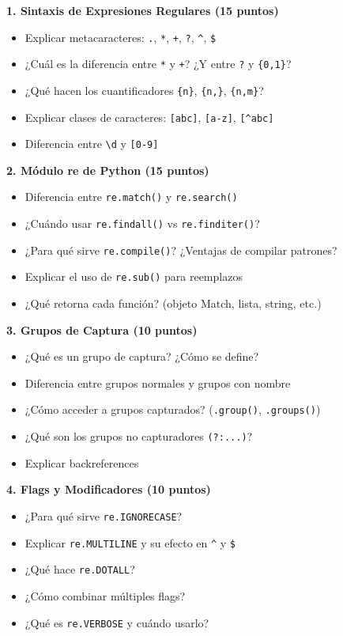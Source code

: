 \documentclass[11pt,letterpaper]{article}
\begin{document}
\textbf{1. Sintaxis de Expresiones Regulares (15 puntos)}
\begin{itemize}
    \item Explicar metacaracteres: \texttt{.}, \texttt{*}, \texttt{+}, \texttt{?}, \texttt{\^{}}, \texttt{\$}
    \item ¿Cuál es la diferencia entre \texttt{*} y \texttt{+}? ¿Y entre \texttt{?} y \texttt{\{0,1\}}?
    \item ¿Qué hacen los cuantificadores \texttt{\{n\}}, \texttt{\{n,\}}, \texttt{\{n,m\}}?
    \item Explicar clases de caracteres: \texttt{[abc]}, \texttt{[a-z]}, \texttt{[\^{}abc]}
    \item Diferencia entre \texttt{\textbackslash d} y \texttt{[0-9]}
\end{itemize}

\textbf{2. Módulo re de Python (15 puntos)}
\begin{itemize}
    \item Diferencia entre \texttt{re.match()} y \texttt{re.search()}
    \item ¿Cuándo usar \texttt{re.findall()} vs \texttt{re.finditer()}?
    \item ¿Para qué sirve \texttt{re.compile()}? ¿Ventajas de compilar patrones?
    \item Explicar el uso de \texttt{re.sub()} para reemplazos
    \item ¿Qué retorna cada función? (objeto Match, lista, string, etc.)
\end{itemize}

\textbf{3. Grupos de Captura (10 puntos)}
\begin{itemize}
    \item ¿Qué es un grupo de captura? ¿Cómo se define?
    \item Diferencia entre grupos normales y grupos con nombre
    \item ¿Cómo acceder a grupos capturados? (\texttt{.group()}, \texttt{.groups()})
    \item ¿Qué son los grupos no capturadores \texttt{(?:...)}?
    \item Explicar backreferences
\end{itemize}

\textbf{4. Flags y Modificadores (10 puntos)}
\begin{itemize}
    \item ¿Para qué sirve \texttt{re.IGNORECASE}?
    \item Explicar \texttt{re.MULTILINE} y su efecto en \texttt{\^{}} y \texttt{\$}
    \item ¿Qué hace \texttt{re.DOTALL}?
    \item ¿Cómo combinar múltiples flags?
    \item ¿Qué es \texttt{re.VERBOSE} y cuándo usarlo?
\end{itemize}
\end{document}
